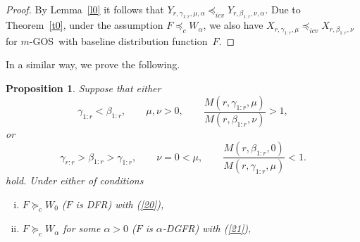 \documentclass [11pt]{article}
\newtheorem{proposition}{Proposition}
\newcommand{\gos}{GOS}
\begin{document}
\begin{proof}
By Lemma~\ref{l0} it follows that $Y_{r,\gamma_{1:r}, \mu,\alpha} \preceq_{icv} Y_{r,\beta_{1:r}, \nu,\alpha}$.
Due to Theorem~\ref{t0}, under the assumption $F \preceq_c W_\alpha$, we also have $X_{r,\gamma_{1:r}, \mu} \preceq_{icv}X_{r,\beta_{1:r}, \nu}$ for $m$-\gos\ with baseline distribution function~$F$.
%
\end{proof} %


In a similar way, we prove the following.
\begin{proposition}\label{c3}
Suppose that either
\begin{equation*}
\label{24}
\gamma_{1:r} < \beta_{1:r},  \qquad \mu,\nu >0, \qquad
\frac{M(r,\gamma_{1:r},\mu)}{M(r,\beta_{1:r},\nu)}>1,
\end{equation*}
or
\begin{equation*}
\label{25}
\gamma_{r:r} > \beta_{1:r} > \gamma_{1:r}, \qquad \nu= 0 < \mu,
\qquad 
\frac{M(r,\beta_{1:r},0)}{M(r,\gamma_{1:r},\mu)}<1.
\end{equation*}
hold. Under either of conditions
    \begin{enumerate}[(i)]
    \item
    $F\succeq_c W_0$ ($F$ is DFR) with (\ref{20}),

    \item
    $F\succeq_c W_\alpha$ for some $\alpha >0$ ($F$ is $\alpha$-DGFR)
    with (\ref{21}),


\end{enumerate}
\end{proposition}
\end{document}

